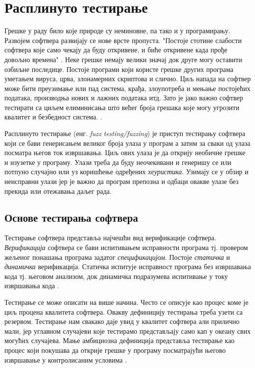 \documentclass[12pt,oneside]{memoir}
\begin{document}
\chapter{Расплинуто тестирање}
\label{chp:rasplTestiranje}

Грешке у раду било које природе су неминовне, па тако и у програмирању. Развојем софтвера развијају се нове врсте пропуста. "Постоје стотине слабости софтвера које само чекају да буду откривене, и биће откривене када прође довољно времена" \cite{fuzzing}. Неке грешке немају велики значај док друге могу оставити озбиљне последице. Постоје програми који користе грешке других програма уметањем вируса, црва, злонамерних скриптова и слично. Циљ напада на софтвер може бити преузимање или пад система, крађа, злоупотреба и мењање постојећих података, производња нових и лажних података итд.  Зато је јако важно софтвер тестирати са циљем елиминисања што већег броја грешака које могу угрозити квалитет и безбедност система. \cite{fuzzing, bezbMalkov}.

Расплинуто тестирање (енг. \textit{fuzz testing/fuzzing}) је приступ тестирању софтвера који се бави генерисањем великог броја улаза у програм а затим за сваки од улаза посматра његов ток извршавања. Циљ ових улаза је да открију необичне грешке и изузетке у програму. Улази треба да буду неочекивани и генеришу се или потпуно случајно или уз коришћење одређених \textit{хеуристика}. Узимају се у обзир и неисправни улази јер је важно да програм препозна и одбаци овакве улазе без прекида или отежавања даљег рада. %

\section{Основе тестирања софтвера}
\label{sec:osnoveTestiranja}

Тестирање софтвера представља најчешћи вид верификације софтвера. \textit{Верификација} софтвера се бави испитивањем исправности програма тј. провером жељеног понашања програма задатог \textit{спецификацијом}. Постоје \textit{статичка} и \textit{динамичка} верификација. Статичка испитује исправност програма без извршавања кода тј. његовом анализом, док динамичка подразумева испитивање у току извршавања кода \cite{milenaDokt}. 

Тестирање се може описати на више начина. Често се описује као процес коме је циљ процена квалитета софтвера. Овакву дефиницију тестирања треба узети са резервом. Тестирање нам свакако даје увид у квалитет софтвера али прилично мали, јер углавном случајеви које тестирамо представљају само кап у океану свих могућих случајева. Мање амбициозна дефиниција представља тестирање као процес који покушава да открије грешке у програму посматрајући његово извршавање у контролисаним условима \cite{testPrinc}.
\end{document}
